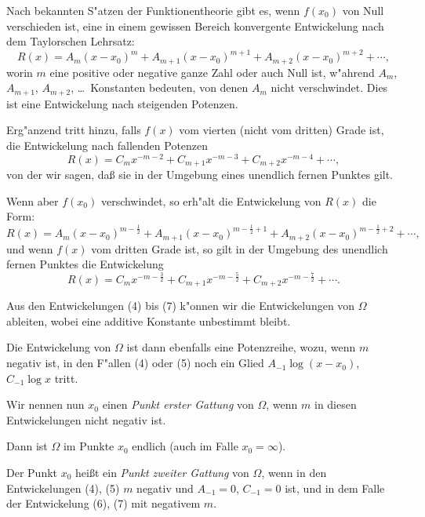 \documentclass[12pt,a4paper]{article}
\theoremstyle{definition}
\begin{document}
Nach bekannten S"atzen der Funktionentheorie gibt es, wenn $f(x_0)$ von Null verschieden ist, eine in einem gewissen Bereich konvergente Entwickelung nach dem Taylorschen Lehrsatz:
\begin{equation}\tag{4}
R(x) = A_m(x-x_0)^m + A_{m+1}(x-x_0)^{m+1} + A_{m+2}(x-x_0)^{m+2} + \cdots,
\end{equation}
worin $m$ eine positive oder negative ganze Zahl oder auch Null ist, w"ahrend $A_m$, $A_{m+1}$, $A_{m+2}$, \ldots\ Konstanten bedeuten, von denen $A_m$ nicht verschwindet. Dies ist eine Entwickelung nach steigenden Potenzen.

Erg"anzend tritt hinzu, falls $f(x)$ vom vierten (nicht vom dritten) Grade ist, die Entwickelung nach fallenden Potenzen
\begin{equation}\tag{5}
R(x) = C_mx^{-m-2} + C_{m+1}x^{-m-3} + C_{m+2}x^{-m-4} + \cdots,
\end{equation}
von der wir sagen, da\ss{}{} sie in der Umgebung eines unendlich fernen Punktes gilt.

Wenn aber $f(x_0)$ verschwindet, so erh"alt die Entwickelung von $R(x)$ die Form:
\begin{equation}\tag{6}
R(x) = A_m(x-x_0)^{m-\frac{1}{2}} + A_{m+1}(x-x_0)^{m-\frac{1}{2}+1} + A_{m+2}(x-x_0)^{m-\frac{1}{2}+2} + \cdots,
\end{equation}
und wenn $f(x)$ vom dritten Grade ist, so gilt in der Umgebung des unendlich fernen Punktes die Entwickelung
\begin{equation}\tag{7}
R(x) = C_mx^{-m-\frac{3}{2}} + C_{m+1}x^{-m-\frac{5}{2}} + C_{m+2}x^{-m-\frac{7}{2}} + \cdots.
\end{equation}

\newpage

Aus den Entwickelungen (4) bis (7) k"onnen wir die Entwickelungen von $\Omega$ ableiten, wobei eine additive Konstante unbestimmt bleibt.

Die Entwickelung von $\Omega$ ist dann ebenfalls eine Potenzreihe, wozu, wenn $m$ negativ ist, in den F"allen (4) oder (5) noch ein Glied $A_{-1}\log(x-x_0)$, $C_{-1}\log x$ tritt.

Wir nennen nun $x_0$ einen \emph{Punkt erster Gattung} von $\Omega$, wenn $m$ in diesen Entwickelungen nicht negativ ist.

Dann ist $\Omega$ im Punkte $x_0$ endlich (auch im Falle $x_0 = \infty$).

Der Punkt $x_0$ hei\ss{}t ein \emph{Punkt zweiter Gattung} von $\Omega$, wenn in den Entwickelungen (4), (5) $m$ negativ und $A_{-1} = 0$, $C_{-1} = 0$ ist, und in dem Falle der Entwickelung (6), (7) mit negativem $m$.
\end{document}
